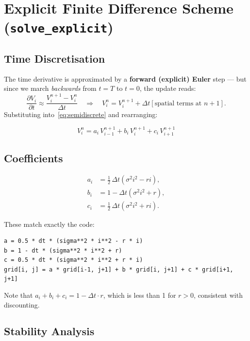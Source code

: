 \documentclass[12pt, a4paper]{article}
\begin{document}
\section{Explicit Finite Difference Scheme (\texttt{solve\_explicit})}

\subsection{Time Discretisation}

The time derivative is approximated by a \textbf{forward (explicit) Euler}
step — but since we march \emph{backwards} from $t = T$ to $t = 0$, the
update reads:
\[
    \frac{\partial V_i}{\partial t} \approx \frac{V_i^{n+1} - V_i^n}{\Delta t}
    \quad \Longrightarrow \quad
    V_i^n = V_i^{n+1} + \Delta t \left[\text{spatial terms at } n+1\right].
\]
Substituting into~\eqref{eq:semidiscrete} and rearranging:

\begin{equation}
    \boxed{V_i^n = a_i\,V_{i-1}^{n+1} + b_i\,V_i^{n+1} + c_i\,V_{i+1}^{n+1}}
    \label{eq:explicit_update}
\end{equation}

\subsection{Coefficients}

\begin{align}
    a_i &= \frac{1}{2}\,\Delta t\!\left(\sigma^2 i^2 - r i\right),
    \label{eq:ai} \\
    b_i &= 1 - \Delta t\!\left(\sigma^2 i^2 + r\right),
    \label{eq:bi} \\
    c_i &= \frac{1}{2}\,\Delta t\!\left(\sigma^2 i^2 + r i\right).
    \label{eq:ci}
\end{align}

These match exactly the code:
\begin{lstlisting}
a = 0.5 * dt * (sigma**2 * i**2 - r * i)
b = 1 - dt * (sigma**2 * i**2 + r)
c = 0.5 * dt * (sigma**2 * i**2 + r * i)
grid[i, j] = a * grid[i-1, j+1] + b * grid[i, j+1] + c * grid[i+1, j+1]
\end{lstlisting}

Note that $a_i + b_i + c_i = 1 - \Delta t\cdot r$, which is less than 1 for
$r > 0$, consistent with discounting.

\subsection{Stability Analysis}
\label{sec:explicit_stability}
\end{document}
